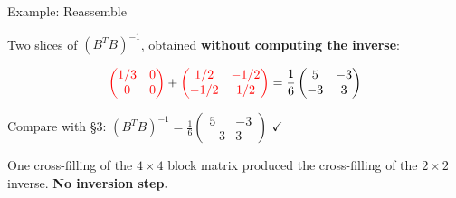 \documentclass[10pt]{beamer}
\theoremstyle{definition}
\newcommand{\x}[1]{\alert{\textbf{#1}}}
\newcommand{\rd}[1]{{\color{red}#1}}                  %
\begin{document}
\begin{frame}{Example: Reassemble}

Two slices of $(B^TB)^{-1}$, obtained \x{without computing the inverse}:

$$\rd{\begin{pmatrix} 1/3 & 0 \\ 0 & 0 \end{pmatrix}} + \rd{\begin{pmatrix} 1/2 & -1/2 \\ -1/2 & 1/2 \end{pmatrix}} = \frac{1}{6}\begin{pmatrix} 5 & -3 \\ -3 & 3 \end{pmatrix}$$

\vspace{0.3em}

Compare with \S3: \; $(B^TB)^{-1} = \frac{1}{6}\begin{pmatrix} 5 & -3 \\ -3 & 3 \end{pmatrix}$ \; $\checkmark$

\vspace{0.5em}

One cross-filling of the $4 \times 4$ block matrix produced the cross-filling of the $2 \times 2$ inverse. \x{No inversion step.}

\end{frame}
\end{document}
